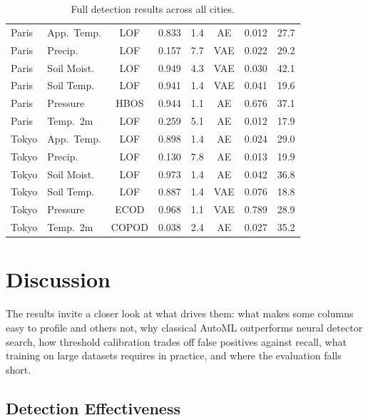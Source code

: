 \documentclass[12pt]{article}
\begin{document}
\begin{table}[!htbp]
\begin{center}
{\begin{tabular}{@{}l l c r r c r r@{}}
\midrule
Paris     & App.\ Temp.  & LOF  & 0.833 &  1.4 & AE  & 0.012 & 27.7 \\
Paris     & Precip.      & LOF  & 0.157 &  7.7 & VAE & 0.022 & 29.2 \\
Paris     & Soil Moist.  & LOF  & 0.949 &  4.3 & VAE & 0.030 & 42.1 \\
Paris     & Soil Temp.   & LOF  & 0.941 &  1.4 & VAE & 0.041 & 19.6 \\
Paris     & Pressure     & HBOS & 0.944 &  1.1 & AE  & 0.676 & 37.1 \\
Paris     & Temp.\ 2m    & LOF  & 0.259 &  5.1 & AE  & 0.012 & 17.9 \\
\midrule
Tokyo     & App.\ Temp.  & LOF  & 0.898 &  1.4 & AE  & 0.024 & 29.0 \\
Tokyo     & Precip.      & LOF  & 0.130 &  7.8 & AE  & 0.013 & 19.9 \\
Tokyo     & Soil Moist.  & LOF  & 0.973 &  1.4 & AE  & 0.042 & 36.8 \\
Tokyo     & Soil Temp.   & LOF  & 0.887 &  1.4 & VAE & 0.076 & 18.8 \\
Tokyo     & Pressure     & ECOD & 0.968 &  1.1 & VAE & 0.789 & 28.9 \\
Tokyo     & Temp.\ 2m    & COPOD& 0.038 &  2.4 & AE  & 0.027 & 35.2 \\
\bottomrule
\end{tabular}
}
\end{center}
\caption{Full detection results across all cities.}
\label{tab:autonn_full}
\end{table}

\section{Discussion}\label{sec:discussion}

The results invite a closer look at what drives them: what makes some columns easy to profile and others not, why classical AutoML outperforms neural detector search, how threshold calibration trades off false positives against recall, what training on large datasets requires in practice, and where the evaluation falls short.

\subsection{Detection Effectiveness}
\end{document}
